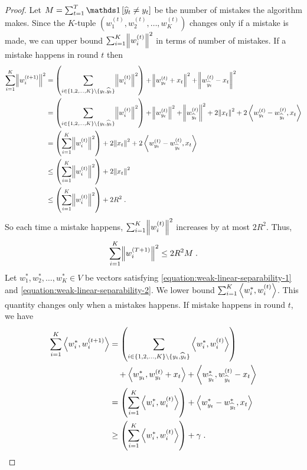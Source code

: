 \begin{proof}
Let $M = \sum_{t=1}^T \indicator{\widehat y_t \neq y_t}$ be the number of
mistakes the algorithm makes. Since the $K$-tuple $(w_1^{(t)}, w_2^{(t)}, \dots,
w_K^{(t)})$ changes only if a mistake is made, we can upper bound $\sum_{i=1}^K
\norm{w_i^{(t)}}^2$ in terms of number of mistakes.
If a mistake happens in round $t$ then
\begin{align*}
\sum_{i=1}^K \norm{w_i^{(t+1)}}^2
& = \left(\sum_{i \in \{1,2,\dots,K\} \setminus \{y_t, \widehat y_t\} } \norm{w_i^{(t)}}^2 \right)
 + \norm{w_{y_t}^{(t)} + x_t}^2 + \norm{w_{\widehat y_t}^{(t)} - x_t}^2 \\
& = \left(\sum_{i \in \{1,2,\dots,K\} \setminus \{y_t, \widehat y_t\} } \norm{w_i^{(t)}}^2 \right) + \norm{w_{y_t}^{(t)}}^2 + \norm{w_{\widehat y_t}^{(t)}}^2 
 + 2 \norm{x_t}^2 + 2 \left\langle w_{y_t}^{(t)} - w_{\widehat y_t}^{(t)}, x_t \right\rangle \\
& = \left(\sum_{i=1}^K \norm{w_i^{(t)}}^2 \right) + 2 \norm{x_t}^2 + 2 \left\langle w_{y_t}^{(t)} - w_{\widehat y_t}^{(t)}, x_t \right\rangle \\
& \le \left(\sum_{i=1}^K \norm{w_i^{(t)}}^2 \right) + 2 \norm{x_t}^2 \\
& \le \left(\sum_{i=1}^K \norm{w_i^{(t)}}^2 \right) + 2 R^2 \; .
\end{align*}
So each time a mistake happens, $\sum_{i=1}^K \norm{w_i^{(t)}}^2$ increases by at most $2R^2$. Thus,
\begin{equation}
\sum_{i=1}^K \norm{w_i^{(T+1)}}^2 \le 2R^2 M \; .
\label{equation:perceptron-norm-ub}
\end{equation}
Let $w_1^*, w_2^*, \dots, w_K^* \in V$ be vectors satisfying
\eqref{equation:weak-linear-separability-1} and
\eqref{equation:weak-linear-separability-2}. We lower bound $\sum_{i=1}^K \left\langle w_i^*, w_i^{(t)} \right\rangle$. This quantity changes
only when a mistakes happens. If mistake happens in round $t$, we have
\begingroup
\allowdisplaybreaks
\begin{align*}
\sum_{i=1}^K \left\langle w_i^*, w_i^{(t+1)} \right\rangle
& = \left( \sum_{i \in \{1,2,\dots,K\} \setminus
\{y_t, \widehat y_t\}} \left\langle w_i^*, w_i^{(t)} \right\rangle \right) \\
 & \quad + \left\langle w_{y_t}^*, w_{y_t}^{(t)} + x_t \right\rangle + 
  \left\langle w_{\widehat y_t}^*, w_{\widehat y_t}^{(t)} - x_t \right\rangle \\
& = \left( \sum_{i=1}^K \left\langle w_i^*, w_i^{(t)} \right\rangle \right) + \left\langle w_{y_t}^* - w_{\widehat y_t}^*, x_t \right\rangle \\
& \ge  \left( \sum_{i=1}^K \left\langle w_i^*, w_i^{(t)} \right\rangle \right) + \gamma \; .
\end{align*}

\end{proof}
